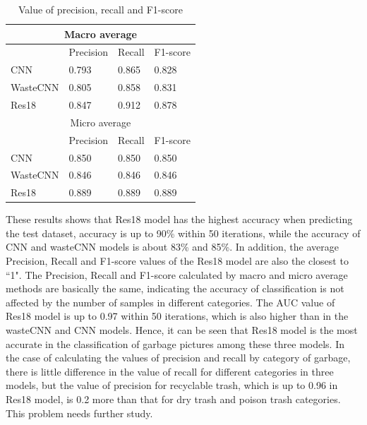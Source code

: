 \documentclass{article}
\begin{document}
\begin{table}[!h]
    \centering
    \begin{tabular}{ |p{2cm}||p{2cm}|p{2cm}|p{2cm}|  }
        \hline
            \multicolumn{4}{|c|}{Macro average} \\
        \hline
             & Precision &Recall&F1-score\\
        \hline
            CNN    &   0.793   &   0.865  &    0.828\\
            WasteCNN    &   0.805   &   0.858   &   0.831\\
            Res18   &   0.847   &   0.912   &   0.878\\
        \hline\hline
            \multicolumn{4}{|c|}{Micro average} \\
        \hline
             & Precision &Recall&F1-score\\
        \hline
            CNN    &   0.850   &   0.850  &    0.850\\
            WasteCNN    &   0.846   &   0.846   &   0.846\\
            Res18   &   0.889   &   0.889   &   0.889\\
        \hline
    \end{tabular}
    \caption{Value of precision, recall and F1-score}
    \label{tab:pre_rec_f1}
\end{table}

These results shows that Res18 model has the highest accuracy when predicting the test dataset, accuracy is up to 90\% within 50 iterations, while the accuracy of CNN and wasteCNN models is about 83\% and 85\%. In addition, the average Precision, Recall and F1-score values of the Res18 model are also the closest to ``1". The Precision, Recall and F1-score calculated by macro and micro average methods are basically the same, indicating the accuracy of classification is not affected by the number of samples in different categories. The AUC value of Res18 model is up to 0.97 within 50 iterations, which is also higher than in the wasteCNN and CNN models. Hence, it can be seen that Res18 model is the most accurate in the classification of garbage pictures among these three models.
In the case of calculating the values of precision and recall by category of garbage, there is little difference in the value of recall for different categories in three models, but the value of precision for recyclable trash, which is up to 0.96 in Res18 model, is 0.2 more than that for dry trash and poison trash categories. This problem needs further study.

\nocite{*}


\end{document}
